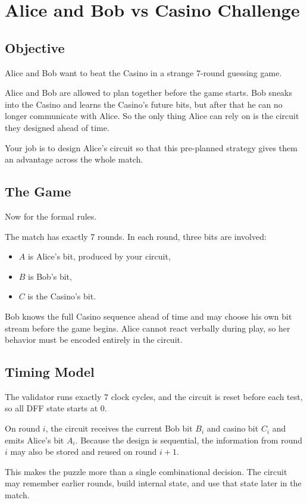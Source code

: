 \section*{Alice and Bob vs Casino Challenge}

\subsection*{Objective}
Alice and Bob want to beat the Casino in a strange 7-round guessing game.

Alice and Bob are allowed to plan together before the game starts. Bob sneaks into the Casino and learns the Casino's future bits, but after that he can no longer communicate with Alice. So the only thing Alice can rely on is the circuit they designed ahead of time.

Your job is to design Alice's circuit so that this pre-planned strategy gives them an advantage across the whole match.

\subsection*{The Game}
Now for the formal rules.

The match has exactly 7 rounds. In each round, three bits are involved:
\begin{itemize}
  \item $A$ is Alice's bit, produced by your circuit,
  \item $B$ is Bob's bit,
  \item $C$ is the Casino's bit.
\end{itemize}

Bob knows the full Casino sequence ahead of time and may choose his own bit stream before the game begins. Alice cannot react verbally during play, so her behavior must be encoded entirely in the circuit.

\subsection*{Timing Model}
The validator runs exactly 7 clock cycles, and the circuit is reset before each test, so all DFF state starts at 0.

On round $i$, the circuit receives the current Bob bit $B_i$ and casino bit $C_i$ and emits Alice's bit $A_i$.
Because the design is sequential, the information from round $i$ may also be stored and reused on round $i+1$.

This makes the puzzle more than a single combinational decision. The circuit may remember earlier rounds, build internal state, and use that state later in the match.

